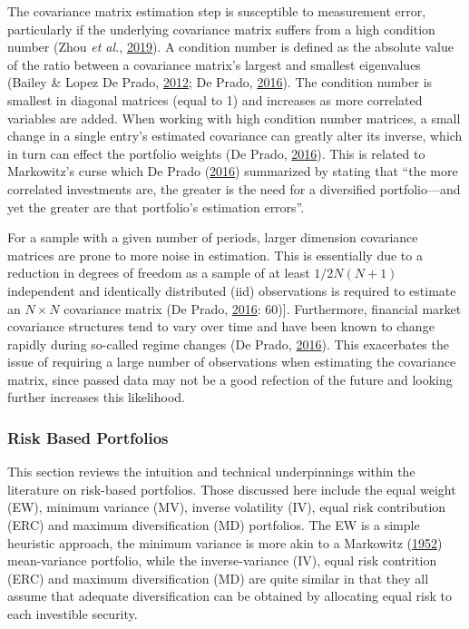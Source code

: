 \documentclass[11pt,preprint, authoryear]{elsarticle}
\numberwithin{equation}{section}
\numberwithin{figure}{section}
\numberwithin{table}{section}
\begin{document}
The covariance matrix estimation step is susceptible to measurement
error, particularly if the underlying covariance matrix suffers from a
high condition number (Zhou \emph{et al.},
\protect\hyperlink{ref-zhou2019}{2019}). A condition number is defined
as the absolute value of the ratio between a covariance matrix's largest
and smallest eigenvalues (Bailey \& Lopez De Prado,
\protect\hyperlink{ref-lopez2012}{2012}; De Prado,
\protect\hyperlink{ref-lopez}{2016}). The condition number is smallest
in diagonal matrices (equal to 1) and increases as more correlated
variables are added. When working with high condition number matrices, a
small change in a single entry's estimated covariance can greatly alter
its inverse, which in turn can effect the portfolio weights (De Prado,
\protect\hyperlink{ref-lopez}{2016}). This is related to Markowitz's
curse which De Prado (\protect\hyperlink{ref-lopez}{2016}) summarized by
stating that ``the more correlated investments are, the greater is the
need for a diversified portfolio---and yet the greater are that
portfolio's estimation errors''.

For a sample with a given number of periods, larger dimension covariance
matrices are prone to more noise in estimation. This is essentially due
to a reduction in degrees of freedom as a sample of at least
\(1/2N(N+1)\) independent and identically distributed (iid) observations
is required to estimate an \(N\times N\) covariance matrix (De Prado,
\protect\hyperlink{ref-lopez}{2016}: 60){]}. Furthermore, financial
market covariance structures tend to vary over time and have been known
to change rapidly during so-called regime changes (De Prado,
\protect\hyperlink{ref-lopez}{2016}). This exacerbates the issue of
requiring a large number of observations when estimating the covariance
matrix, since passed data may not be a good refection of the future and
looking further increases this likelihood.

\hypertarget{risk-based-portfolios}{%
\subsubsection{Risk Based Portfolios}\label{risk-based-portfolios}}

This section reviews the intuition and technical underpinnings within
the literature on risk-based portfolios. Those discussed here include
the equal weight (EW), minimum variance (MV), inverse volatility (IV),
equal risk contribution (ERC) and maximum diversification (MD)
portfolios. The EW is a simple heuristic approach, the minimum variance
is more akin to a Markowitz (\protect\hyperlink{ref-markowitz}{1952})
mean-variance portfolio, while the inverse-variance (IV), equal risk
contrition (ERC) and maximum diversification (MD) are quite similar in
that they all assume that adequate diversification can be obtained by
allocating equal risk to each investible security.
\end{document}
